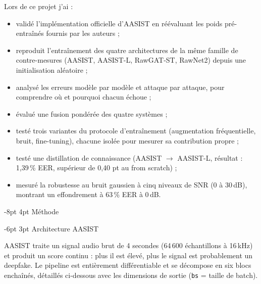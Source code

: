 \documentclass[10pt, a4paper]{article}
\makeatletter
\renewcommand{\section}{\@startsection{section}{1}{\z@}%
  {-8pt \@plus -2pt \@minus -2pt}{4pt \@plus 1pt}%
  {\normalfont\Large\bfseries}}
\renewcommand{\subsection}{\@startsection{subsection}{2}{\z@}%
  {-6pt \@plus -2pt \@minus -1pt}{3pt \@plus 1pt}%
  {\normalfont\large\bfseries}}
\makeatother
\begin{document}
Lors de ce projet j'ai :
\begin{itemize}
  \item validé l'implémentation officielle d'AASIST en réévaluant les poids pré-entraînés fournis par les auteurs ;
  \item reproduit l'entraînement des quatre architectures de la même famille de contre-mesures (AASIST, AASIST-L, RawGAT-ST, RawNet2) depuis une initialisation aléatoire ;
  \item analysé les erreurs modèle par modèle et attaque par attaque, pour comprendre où et pourquoi chacun échoue ;
  \item évalué une fusion pondérée des quatre systèmes ;
  \item testé trois variantes du protocole d'entraînement (augmentation fréquentielle, bruit, fine-tuning), chacune isolée pour mesurer sa contribution propre ;
  \item testé une distillation de connaissance (AASIST $\rightarrow$ AASIST-L, résultat : 1,39\,\% EER, supérieur de 0,40 pt au from scratch) ;
  \item mesuré la robustesse au bruit gaussien à cinq niveaux de SNR (0 à 30\,dB), montrant un effondrement à 63\,\% EER à 0\,dB.
\end{itemize}

\section{Méthode}

\subsection{Architecture AASIST}

AASIST traite un signal audio brut de 4 secondes (64\,600 échantillons à 16\,kHz) et produit un score continu : plus il est élevé, plus le signal est probablement un deepfake. Le pipeline est entièrement différentiable et se décompose en six blocs enchaînés, détaillés ci-dessous avec les dimensions de sortie (\texttt{bs} = taille de batch).
\end{document}
